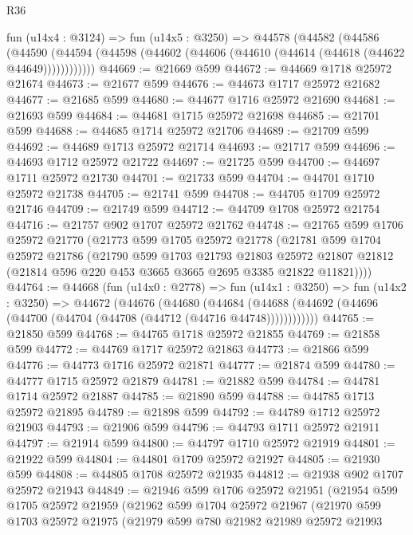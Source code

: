 \begin{lexlean}{R36}
\begin{coremodule}
    fun (u14x4 : @3124) =>
    fun (u14x5 : @3250) =>
    @44578
      (@44582
        (@44586
          (@44590 (@44594 (@44598 (@44602 (@44606 (@44610 (@44614 (@44618 (@44622 @44649))))))))))))
@44669 := @21669 @599
@44672 := @44669 @1718 @25972 @21674
@44673 := @21677 @599
@44676 := @44673 @1717 @25972 @21682
@44677 := @21685 @599
@44680 := @44677 @1716 @25972 @21690
@44681 := @21693 @599
@44684 := @44681 @1715 @25972 @21698
@44685 := @21701 @599
@44688 := @44685 @1714 @25972 @21706
@44689 := @21709 @599
@44692 := @44689 @1713 @25972 @21714
@44693 := @21717 @599
@44696 := @44693 @1712 @25972 @21722
@44697 := @21725 @599
@44700 := @44697 @1711 @25972 @21730
@44701 := @21733 @599
@44704 := @44701 @1710 @25972 @21738
@44705 := @21741 @599
@44708 := @44705 @1709 @25972 @21746
@44709 := @21749 @599
@44712 := @44709 @1708 @25972 @21754
@44716 := @21757 @902 @1707 @25972 @21762
@44748 := @21765
    @599
    @1706
    @25972
    @21770
    (@21773
      @599
      @1705
      @25972
      @21778
      (@21781
        @599
        @1704
        @25972
        @21786
        (@21790
          @599
          @1703
          @21793
          @21803
          @25972
          @21807
          @21812
          (@21814 @596 @220 @453 @3665 @3665 @2695 @3385 @21822 @11821))))
@44764 := @44668
    (fun (u14x0 : @2778) =>
    fun (u14x1 : @3250) =>
    fun (u14x2 : @3250) =>
    @44672
      (@44676
        (@44680
          (@44684 (@44688 (@44692 (@44696 (@44700 (@44704 (@44708 (@44712 (@44716 @44748))))))))))))
@44765 := @21850 @599
@44768 := @44765 @1718 @25972 @21855
@44769 := @21858 @599
@44772 := @44769 @1717 @25972 @21863
@44773 := @21866 @599
@44776 := @44773 @1716 @25972 @21871
@44777 := @21874 @599
@44780 := @44777 @1715 @25972 @21879
@44781 := @21882 @599
@44784 := @44781 @1714 @25972 @21887
@44785 := @21890 @599
@44788 := @44785 @1713 @25972 @21895
@44789 := @21898 @599
@44792 := @44789 @1712 @25972 @21903
@44793 := @21906 @599
@44796 := @44793 @1711 @25972 @21911
@44797 := @21914 @599
@44800 := @44797 @1710 @25972 @21919
@44801 := @21922 @599
@44804 := @44801 @1709 @25972 @21927
@44805 := @21930 @599
@44808 := @44805 @1708 @25972 @21935
@44812 := @21938 @902 @1707 @25972 @21943
@44849 := @21946
    @599
    @1706
    @25972
    @21951
    (@21954
      @599
      @1705
      @25972
      @21959
      (@21962
        @599
        @1704
        @25972
        @21967
        (@21970
          @599
          @1703
          @25972
          @21975
          (@21979
            @599
            @780
            @21982
            @21989
            @25972
            @21993

\end{coremodule}
\end{lexlean}
